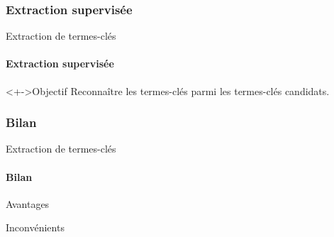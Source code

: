 \subsubsection{Extraction supervisée}
  \begin{frame}{Extraction de termes-clés}\framesubtitle{Extraction supervisée}
    \begin{block}<+->{Objectif}
      Reconnaître les termes-clés parmi les termes-clés candidats.
    \end{block}

  \end{frame}

\subsubsection{Bilan}
  \begin{frame}{Extraction de termes-clés}\framesubtitle{Bilan}
    \begin{block}{Avantages}
    \end{block}

    \begin{alertblock}{Inconvénients}
    \end{alertblock}
    
  \end{frame}

